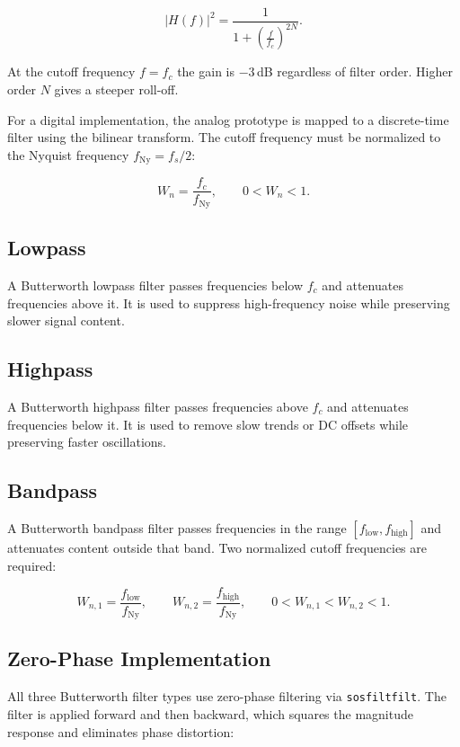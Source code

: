 \documentclass[11pt,a4paper]{article}
\begin{document}
\[
|H(f)|^2 = \frac{1}{1 + \left(\frac{f}{f_c}\right)^{2N}}.
\]

At the cutoff frequency $f = f_c$ the gain is $-3$\,dB regardless of filter order. Higher order $N$ gives a steeper roll-off.

For a digital implementation, the analog prototype is mapped to a discrete-time filter using the bilinear transform. The cutoff frequency must be normalized to the Nyquist frequency $f_{\mathrm{Ny}} = f_s / 2$:

\[
W_n = \frac{f_c}{f_{\mathrm{Ny}}}, \qquad 0 < W_n < 1.
\]

\subsection{Lowpass}

A Butterworth lowpass filter passes frequencies below $f_c$ and attenuates frequencies above it. It is used to suppress high-frequency noise while preserving slower signal content.

\subsection{Highpass}

A Butterworth highpass filter passes frequencies above $f_c$ and attenuates frequencies below it. It is used to remove slow trends or DC offsets while preserving faster oscillations.

\subsection{Bandpass}

A Butterworth bandpass filter passes frequencies in the range $[f_{\mathrm{low}}, f_{\mathrm{high}}]$ and attenuates content outside that band. Two normalized cutoff frequencies are required:

\[
W_{n,1} = \frac{f_{\mathrm{low}}}{f_{\mathrm{Ny}}}, \qquad W_{n,2} = \frac{f_{\mathrm{high}}}{f_{\mathrm{Ny}}}, \qquad 0 < W_{n,1} < W_{n,2} < 1.
\]

\subsection{Zero-Phase Implementation}

All three Butterworth filter types use zero-phase filtering via \texttt{sosfiltfilt}. The filter is applied forward and then backward, which squares the magnitude response and eliminates phase distortion:
\end{document}
